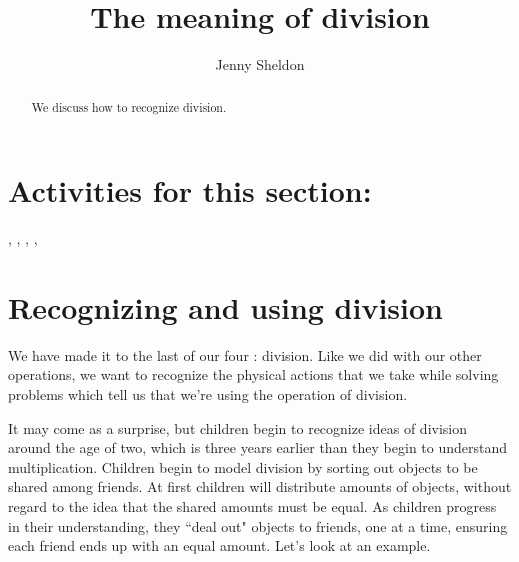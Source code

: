 \documentclass{ximera}
\title{The meaning of division}
\author{Jenny Sheldon}
\begin{document}
\begin{abstract}
We discuss how to recognize division.
\end{abstract}
\maketitle

\section{Activities for this section:} 
, 
, 
, 
, 


\section{Recognizing and using division}
We have made it to the last of our four : division. Like we did with our other operations, we want to recognize the physical actions that we take while solving problems which tell us that we're using the operation of division. 

It may come as a surprise, but children begin to recognize ideas of division around the age of two, which is three years earlier than they begin to understand multiplication. Children begin to model division by sorting out objects to be shared among friends. At first children will distribute amounts of objects, without regard to the idea that the shared amounts must be equal. As children progress in their understanding, they ``deal out" objects to friends, one at a time, ensuring each friend ends up with an equal amount. Let's look at an example.
\end{document}
